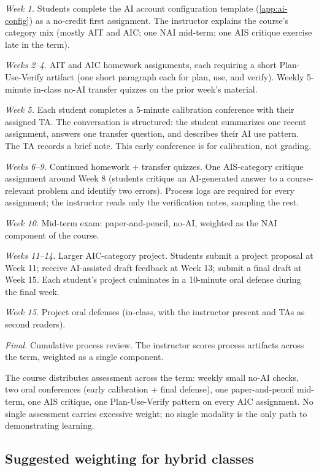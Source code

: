 \documentclass{SIAMbook2023}
\begin{document}
\emph{Week 1.} Students complete the AI account configuration template (\cref{app:ai-config}) as a no-credit first assignment. The instructor explains the course's category mix (mostly AIT and AIC; one NAI mid-term; one AIS critique exercise late in the term).

\emph{Weeks 2--4.} AIT and AIC homework assignments, each requiring a short Plan-Use-Verify artifact (one short paragraph each for plan, use, and verify). Weekly 5-minute in-class no-AI transfer quizzes on the prior week's material.

\emph{Week 5.} Each student completes a 5-minute calibration conference with their assigned TA. The conversation is structured: the student summarizes one recent assignment, answers one transfer question, and describes their AI use pattern. The TA records a brief note. This early conference is for calibration, not grading.

\emph{Weeks 6--9.} Continued homework + transfer quizzes. One AIS-category critique assignment around Week 8 (students critique an AI-generated answer to a course-relevant problem and identify two errors). Process logs are required for every assignment; the instructor reads only the verification notes, sampling the rest.

\emph{Week 10.} Mid-term exam: paper-and-pencil, no-AI, weighted as the NAI component of the course.

\emph{Weeks 11--14.} Larger AIC-category project. Students submit a project proposal at Week 11; receive AI-assisted draft feedback at Week 13; submit a final draft at Week 15. Each student's project culminates in a 10-minute oral defense during the final week.

\emph{Week 15.} Project oral defenses (in-class, with the instructor present and TAs as second readers).

\emph{Final.} Cumulative process review. The instructor scores process artifacts across the term, weighted as a single component.

The course distributes assessment across the term: weekly small no-AI checks, two oral conferences (early calibration + final defense), one paper-and-pencil mid-term, one AIS critique, one Plan-Use-Verify pattern on every AIC assignment. No single assessment carries excessive weight; no single modality is the only path to demonstrating learning.

\subsection{Suggested weighting for hybrid classes}
\label{i:subsec:hybrid-weighting}
\end{document}
